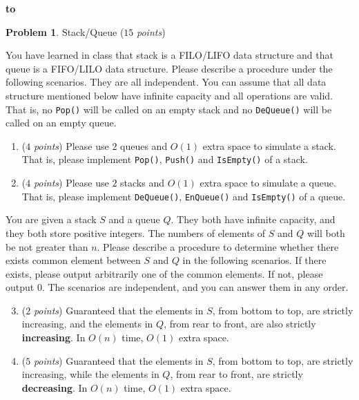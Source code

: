 \documentclass[12pt,a4paper]{report}
\newcommand{\points}[1]{ ($#1$ \textit{points}) }
\theoremstyle{definition}
\newtheorem{problem}{\textbf{Problem}}
\theoremstyle{definition}
\def\headline#1{\hbox to \hsize{\hrulefill\quad\lower.3em\hbox{#1}\quad\hrulefill}}
\def\headline#1{\hbox to \hsize{\hrulefill\quad\lower.3em\hbox{#1}\quad\hrulefill}}
\begin{document}
\vspace{5pt}

\begin{center}
\textbf{\headline{\large Non-Programming Part}}
\end{center}
\vspace{10pt}

\begin{problem} Stack/Queue \points{15}

    You have learned in class that stack is a FILO/LIFO data structure and that queue is a FIFO/LILO data structure.
    Please describe a procedure under the following scenarios. They are all independent.
    You can assume that all data structure mentioned below have infinite capacity and all operations are valid.
    That is, no \texttt{Pop()} will be called on an empty stack and no \texttt{DeQueue()} will be called on an empty queue.
\begin{enumerate}[label=\alph*.]
    \item \points{4}Please use $2$ queues and $O(1)$ extra space to simulate a stack. That is, please implement \texttt{Pop()}, \texttt{Push()} and \texttt{IsEmpty()} of a stack.
    \item \points{4}Please use $2$ stacks and $O(1)$ extra space to simulate a queue. That is, please implement \texttt{DeQueue()}, \texttt{EnQueue()} and \texttt{IsEmpty()} of a queue.
\end{enumerate}
    You are given a stack $S$ and a queue $Q$. They both have infinite capacity, and they both store positive integers. The numbers of elements of $S$ and $Q$ will both be not greater than $n$. Please describe a procedure to determine whether there exists common element between $S$ and $Q$ in the following scenarios. If there exists, please output arbitrarily one of the common elements. If not, please output $0$.  The scenarios are independent, and you can answer them in any order.
\begin{enumerate}[label=\alph*.]
    \setcounter{enumi}{2}
\item \points{2}Guaranteed that the elements in $S$, from bottom to top, are strictly increasing, and the elements in $Q$, from rear to front, are also strictly \textbf{increasing}. In $O(n)$ time, $O(1)$ extra space.
\item \points{5}Guaranteed that the elements in $S$, from bottom to top, are strictly increasing, while the elements in $Q$, from rear to front, are strictly \textbf{decreasing}. In $O(n)$ time, $O(1)$ extra space.
\end{enumerate}
\end{problem}
\newpage
\end{document}

